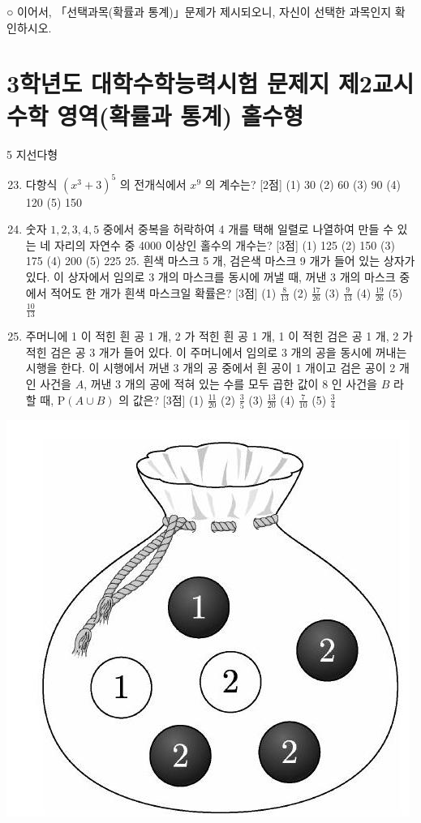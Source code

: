 \documentclass[10pt]{article}
\begin{document}
○ 이어서, 「선택과목(확률과 통계)」문제가 제시되오니, 자신이 선택한 과목인지 확인하시오.

\section{3학년도 대학수학능력시험 문제지
제2교시 수학 영역(확률과 통계)
홀수형}
5 지선다형

\begin{enumerate}
  \setcounter{enumi}{22}
  \item 다항식 $\left(x^{3}+3\right)^{5}$ 의 전개식에서 $x^{9}$ 의 계수는? [2점]
(1) 30
(2) 60
(3) 90
(4) 120
(5) 150

  \item 숫자 $1,2,3,4,5$ 중에서 중복을 허락하여 4 개를 택해 일렬로 나열하여 만들 수 있는 네 자리의 자연수 중 4000 이상인 홀수의 개수는? [3점]
(1) 125
(2) 150
(3) 175
(4) 200
(5) 225 25. 흰색 마스크 5 개, 검은색 마스크 9 개가 들어 있는 상자가 있다. 이 상자에서 임의로 3 개의 마스크를 동시에 꺼낼 때, 꺼낸 3 개의 마스크 중에서 적어도 한 개가 흰색 마스크일 확률은? [3점]
(1) $\frac{8}{13}$
(2) $\frac{17}{26}$
(3) $\frac{9}{13}$
(4) $\frac{19}{26}$
(5) $\frac{10}{13}$

  \item 주머니에 1 이 적힌 흰 공 1 개, 2 가 적힌 흰 공 1 개, 1 이 적힌 검은 공 1 개, 2 가 적힌 검은 공 3 개가 들어 있다. 이 주머니에서 임의로 3 개의 공을 동시에 꺼내는 시행을 한다. 이 시행에서 꺼낸 3 개의 공 중에서 흰 공이 1 개이고 검은 공이 2 개인 사건을 $A$, 꺼낸 3 개의 공에 적혀 있는 수를 모두 곱한 값이 8 인 사건을 $B$ 라 할 때, $\mathrm{P}(A \cup B)$ 의 값은? [3점]
(1) $\frac{11}{20}$
(2) $\frac{3}{5}$
(3) $\frac{13}{20}$
(4) $\frac{7}{10}$
(5) $\frac{3}{4}$

\end{enumerate}

\begin{center}
\includegraphics[max width=\textwidth]{2023_05_19_a9cef858603f6abf5411g-10}
\end{center}
\end{document}
